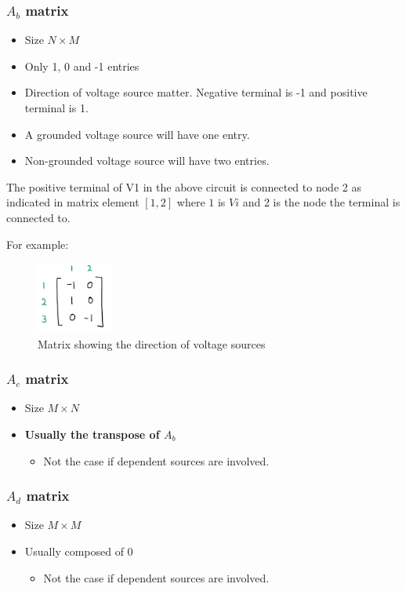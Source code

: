 \documentclass[a4paper, titlepage]{article}
\begin{document}
    \subsubsection{$A_b$ matrix}
    \begin{itemize}
        \item Size $N\times M$
        \item Only 1, 0 and -1 entries
        \item Direction of voltage source matter. Negative terminal is -1 and positive terminal is 1.
        \item A grounded voltage source will have one entry.
        \item Non-grounded voltage source will have two entries.
    \end{itemize}
    The positive terminal of V1 in the above circuit is connected to node 2 as indicated in matrix element $[1, 2]$ where $1$ is $Vi$ and 2 is the node the terminal is connected to.
    \par
    For example: 
    \begin{figure}[htp]
        \centering
        \includegraphics[width=25mm,scale=0.25]{Matrix3}
        \caption{Matrix showing the direction of voltage sources}
        \label{fig:figure3}
    \end{figure}

    \subsubsection{$A_c$ matrix}
    \begin{itemize}
        \item Size $M\times N$
        \item \textbf{Usually the transpose of $A_b$}
        \begin{itemize}
            \item Not the case if dependent sources are involved.
        \end{itemize}
    \end{itemize}
   
    \subsubsection{$A_d$ matrix}
    \begin{itemize}
        \item Size $M\times M$
        \item Usually composed of 0
        \begin{itemize}
            \item Not the case if dependent sources are involved.
        \end{itemize}
    \end{itemize}
    \vfill
    \pagebreak
\end{document}
